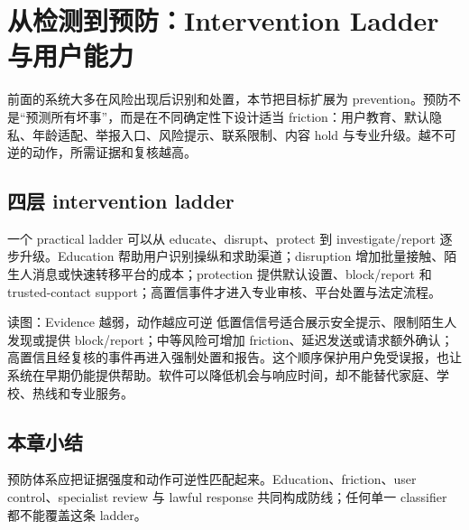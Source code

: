 \section{从检测到预防：Intervention Ladder 与用户能力}

前面的系统大多在风险出现后识别和处置，本节把目标扩展为 prevention。预防不是“预测所有坏事”，而是在不同确定性下设计适当 friction：用户教育、默认隐私、年龄适配、举报入口、风险提示、联系限制、内容 hold 与专业升级。越不可逆的动作，所需证据和复核越高。

\subsection{四层 intervention ladder}

一个 practical ladder 可以从 educate、disrupt、protect 到 investigate/report 逐步升级。Education 帮助用户识别操纵和求助渠道；disruption 增加批量接触、陌生人消息或快速转移平台的成本；protection 提供默认设置、block/report 和 trusted-contact support；高置信事件才进入专业审核、平台处置与法定流程。


\begin{knowledgebox}{读图：Evidence 越弱，动作越应可逆}
低置信信号适合展示安全提示、限制陌生人发现或提供 block/report；中等风险可增加 friction、延迟发送或请求额外确认；高置信且经复核的事件再进入强制处置和报告。这个顺序保护用户免受误报，也让系统在早期仍能提供帮助。软件可以降低机会与响应时间，却不能替代家庭、学校、热线和专业服务。
\end{knowledgebox}


\subsection{本章小结}

预防体系应把证据强度和动作可逆性匹配起来。Education、friction、user control、specialist review 与 lawful response 共同构成防线；任何单一 classifier 都不能覆盖这条 ladder。

